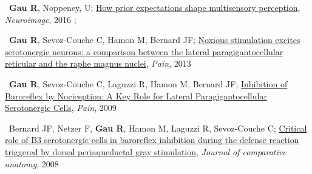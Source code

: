 \textbullet~\textbf{Gau R}, Noppeney, U;
\href{https://osf.io/8frkq/}{How prior expectations shape multisensory perception},
\textit{Neuroimage},
2016
\newline
{};

\textbullet~\textbf{Gau R}, Sevoz-Couche C, Hamon M, Bernard JF;
\href{https://osf.io/ktcv9/}{Noxious stimulation excites serotonergic neurons: a comparison between the lateral paragigantocellular reticular and the raphe magnus nuclei},
\textit{Pain},
2013
\newline
{}

\textbullet~\textbf{Gau R}, Sevoz-Couche C, Laguzzi R, Hamon M, Bernard JF;
\href{https://osf.io/cqhvb/}{Inhibition of Baroreflex by Nociception: A Key Role for Lateral Paragigantocellular Serotonergic Cells},
\textit{Pain},
2009
\newline
{}

\textbullet~Bernard JF, Netzer F, \textbf{Gau R}, Hamon M, Laguzzi R, Sevoz-Couche C;
\href{https://osf.io/rcvuj/}{Critical role of B3 serotonergic cells in baroreflex inhibition during the defense reaction triggered by dorsal periaqueductal gray stimulation},
\textit{Journal of comparative anatomy},
2008
\newline
{}
